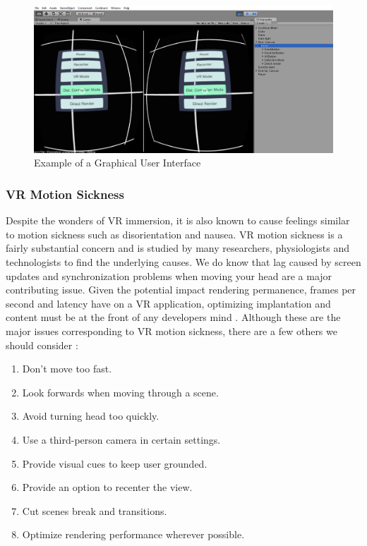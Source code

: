 \documentclass[12pt]{article}
\begin{document}
 \begin{figure}[h]
    \centering
 \includegraphics[width=.7\textwidth]{DemoSoftware1}
  \caption{Example of a Graphical User Interface}
  \label{fig:GUI}
 \end{figure}



\subsubsection{VR Motion Sickness}

Despite the wonders of VR immersion, it is also known to cause feelings similar to motion sickness such as disorientation and nausea. VR motion sickness is a fairly substantial concern and is studied by many researchers, physiologists and technologists to find the underlying causes. We do know that lag caused by screen updates and synchronization problems when moving your head are a major contributing issue.
Given the potential impact rendering permanence, frames per second and latency have on a VR application, optimizing implantation and content must be at the front of any developers mind \cite{gobbetti}. 
 Although these are the major issues corresponding to VR motion sickness, there are a few others we should consider \cite{linowes}:

\begin{enumerate}[topsep=0pt,itemsep=-1ex,partopsep=1ex,parsep=1ex]
  \item Don't move too fast.
  \item Look forwards when moving through a scene.
  \item Avoid turning head too quickly.
  \item Use a third-person camera in certain settings.
  \item Provide visual cues to keep user grounded.
  \item Provide an option to recenter the view.
  \item Cut scenes break and transitions.
  \item Optimize rendering performance wherever possible.
\end{enumerate}
\end{document}
